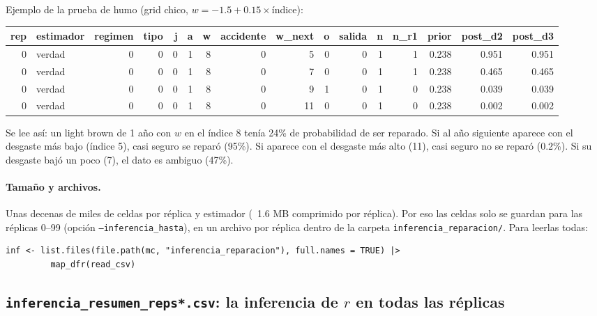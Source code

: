 \documentclass[11pt]{article}
\newcommand{\archivo}[1]{\textbf{\texttt{#1}}}
\begin{document}
Ejemplo de la prueba de humo (grid chico, $w=-1.5+0.15\times$índice):
\begin{center}\footnotesize
\begin{adjustbox}{max width=\textwidth}\begin{tabular}{rlrrrrrrrrrrrrrr}
\toprule
rep & estimador & regimen & tipo & j & a & w & accidente & w\_next & o & salida & n & n\_r1 & prior & post\_d2 & post\_d3\\
\midrule
0 & verdad & 0 & 0 & 0 & 1 & 8 & 0 & 5 & 0 & 0 & 1 & 1 & 0.238 & 0.951 & 0.951\\
0 & verdad & 0 & 0 & 0 & 1 & 8 & 0 & 7 & 0 & 0 & 1 & 1 & 0.238 & 0.465 & 0.465\\
0 & verdad & 0 & 0 & 0 & 1 & 8 & 0 & 9 & 1 & 0 & 1 & 0 & 0.238 & 0.039 & 0.039\\
0 & verdad & 0 & 0 & 0 & 1 & 8 & 0 & 11 & 0 & 0 & 1 & 0 & 0.238 & 0.002 & 0.002\\
\bottomrule
\end{tabular}\end{adjustbox}
\end{center}
Se lee así: un light brown de 1 año con $w$ en el índice 8 tenía 24\% de probabilidad de ser
reparado. Si al año siguiente aparece con el desgaste más bajo (índice 5), casi seguro se
reparó (95\%). Si aparece con el desgaste más alto (11), casi seguro no se reparó (0.2\%).
Si su desgaste bajó un poco (7), el dato es ambiguo (47\%).

\paragraph{Tamaño y archivos.} Unas decenas de miles de celdas por réplica y estimador
(~1.6 MB comprimido por réplica). Por eso las celdas solo se guardan para las réplicas 0--99
(opción \texttt{--inferencia\_hasta}), en un archivo por réplica dentro de la carpeta
\texttt{inferencia\_reparacion/}. Para leerlas todas:
\begin{Verbatim}
inf <- list.files(file.path(mc, "inferencia_reparacion"), full.names = TRUE) |>
         map_dfr(read_csv)
\end{Verbatim}

\subsection{\archivo{inferencia\_resumen\_reps*.csv}: la inferencia de $r$ en todas las réplicas}
\end{document}
